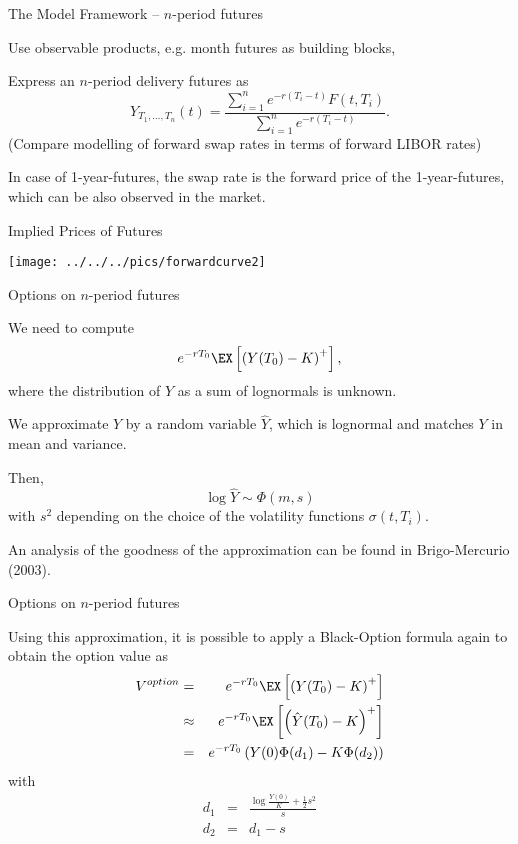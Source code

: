 {The Model Framework -- $n$-period futures}
\item<1-> Use observable products, e.g. month futures as building blocks,
\item<2-> Express an $n$-period delivery futures as
$$Y_{T_1, \ldots, T_n}(t)=\frac{\sum_{i=1}^n e^{-r(T_i-t)}F(t,T_i)}{\sum_{i=1}^n e^{-r(T_i-t)}}.$$
(Compare modelling of forward swap rates in terms of forward LIBOR rates)
\item<3-> In case of 1-year-futures, the swap rate is the forward price of the 1-year-futures,
which can be also observed in the market.

{Implied Prices of Futures}
\begin{center}
\texttt{[image: ../../../pics/forwardcurve2]}
\end{center}

{Options on $n$-period futures}
\item<1-> We need to compute
$$e^{-rT_0} \EX \left[\left(Y(T_0)-K\right)^+\right],$$
where the distribution of $Y$ as a sum of lognormals is unknown.
\item<2->
We approximate $Y$ by a random variable $\hat{Y}$,
which is lognormal and matches $Y$ in mean and variance.
\item<3->
Then,
$$\log \hat{Y} \sim \Phi(m,s)$$
with $s^2$ depending on the choice of the volatility functions
$\sigma(t,T_i)$.
\item<4->
An analysis of the goodness of the approximation
can be found in Brigo-Mercurio (2003).

{Options on $n$-period futures}

Using this approximation, it
is possible to apply a Black-Option formula again to obtain the
option value as
\begin{eqnarray}\label{eq:approx-option}
V^{option} & = & e^{-rT_0} \EX \left[\left(Y(T_0)-K\right)^+\right] \nonumber \\
& \approx & e^{-rT_0} \EX \left[\left(\hat{Y}(T_0)-K\right)^+\right]\nonumber \\
& = &  e^{-rT_0} \left(Y(0)\Phi(d_1)-K\Phi(d_2)\right)
\end{eqnarray}
with
\begin{eqnarray*}
d_1& = & \frac{\log \frac{Y(0)}{K}+\frac{1}{2}s^2}{s}\\
d_2 & = & d_1 - s
\end{eqnarray*}

